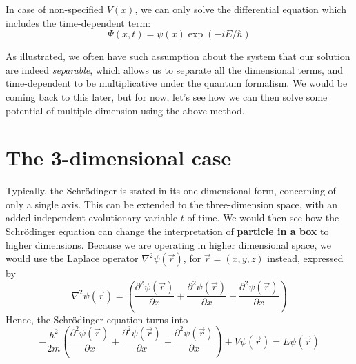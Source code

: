 In case of non-specified $V(x)$, we can only solve the differential equation which includes the time-dependent term: 
\begin{equation}
  \Psi(x,t) = \psi(x)\exp{(-iE/ \hbar)}
\end{equation}

As illustrated, we often have such assumption about the system that our solution are indeed \textit{separable}, which allows us to separate all the dimensional terms, and time-dependent to be multiplicative under the quantum formalism. We would be coming back to this later, but for now, let's see how we can then solve some potential of multiple dimension using the above method. 

\section{The 3-dimensional case}
Typically, the Schrödinger is stated in its one-dimensional form, concerning of only a single axis. This can be extended to the three-dimension space, with an added independent evolutionary variable $t$ of time. We would then see how the Schrödinger equation can change the interpretation of \textbf{particle in a box} to higher dimensions. Because we are operating in higher dimensional space, we would use the Laplace operator $\nabla^2\psi(\vec{r})$, for $\vec{r}=(x,y,z)$ instead, expressed by 
\begin{equation}
  \nabla^{2}\psi(\vec{r}) = \left( \frac{\partial^{2}\psi (\vec{r})}{\partial x} + \frac{\partial^{2}\psi (\vec{r})}{\partial x}+\frac{\partial^{2}\psi (\vec{r})}{\partial x} \right)
\end{equation}
Hence, the Schrödinger equation turns into 
\begin{equation}
  - \frac{h^{2}}{2m} \left( \frac{\partial^{2}\psi (\vec{r})}{\partial x} + \frac{\partial^{2}\psi (\vec{r})}{\partial x}+\frac{\partial^{2}\psi (\vec{r})}{\partial x} \right) + V\psi(\vec{r}) = E\psi(\vec{r})
\end{equation}

